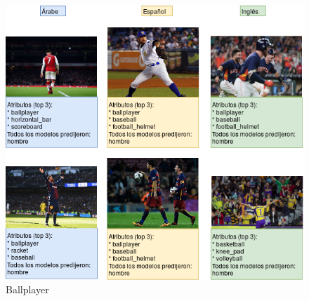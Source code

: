 \documentclass[runningheads]{llncs}
\begin{document}
\begin{figure}
    \centering
    \includegraphics[scale=0.37]{img/best_gi/ball_player_gi.png}
    \caption{Ballplayer}
    \label{fig:ballplayer}
\end{figure}

\newpage
\end{document}
